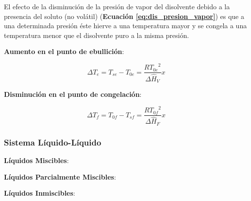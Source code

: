             El efecto de la disminución de la presión de vapor del disolvente debido a la presencia del soluto (no volátil) (\textbf{Ecuación \ref{eq:dis_presion_vapor}}) es que a una determinada presión éste hierve a una temperatura mayor y se congela a una temperatura menor que el disolvente puro a la misma presión.
        
            \textbf{Aumento en el punto de ebullición}:
            
            \begin{equation}
            \label{eq:aum_punto_ebull}
                \Delta T_{e} = T_{se} - T_{0e} = \frac{R{T_{0e}}^{2}}{\Delta \widehat{H}_{V}} x
            \end{equation}
            
            \textbf{Disminución en el punto de congelación}:
            
            \begin{equation}
            \label{eq:dis_punto_cri}
                \Delta T_{f} = T_{0f} - T_{sf} = \frac{R{T_{0f}}^{2}}{\Delta \widehat{H}_{F}} x
            \end{equation}
            
        \subsubsection{Sistema Líquido-Líquido}
        
            
            \textbf{Líquidos Miscibles}:
            
            \begin{quote}
                \textit{}
            \end{quote}
            
            \textbf{Líquidos Parcialmente Miscibles}:
            
            \begin{quote}
                \textit{}
            \end{quote}
            
            \textbf{Líquidos Inmiscibles}:
            
            \begin{quote}
                \textit{}
            \end{quote}
            
